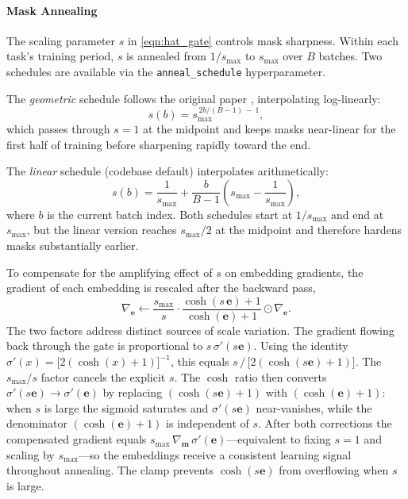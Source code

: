 \paragraph{Mask Annealing}

The scaling parameter $s$ in \eqref{eqn:hat_gate} controls mask sharpness.
Within each task's training period, $s$ is annealed from $1/s_\text{max}$ to
$s_\text{max}$ over $B$ batches. Two schedules are available via the
\texttt{anneal\_schedule} hyperparameter.

The \emph{geometric} schedule follows the original paper \cite{ll_hat_2018},
interpolating log-linearly:
%
\begin{equation}\label{eqn:hat_anneal_geometric}
    s(b)
    =
    s_\text{max}^{\,2b/(B-1)\,-\,1} ,
\end{equation}
%
which passes through $s = 1$ at the midpoint and keeps masks near-linear for
the first half of training before sharpening rapidly toward the end.

The \emph{linear} schedule (codebase default) interpolates arithmetically:
%
\begin{equation}\label{eqn:hat_anneal_linear}
    s(b)
    =
    \frac{1}{s_\text{max}}
    +
    \frac{b}{B-1}
    \left(s_\text{max} - \frac{1}{s_\text{max}}\right) ,
\end{equation}
%
where $b$ is the current batch index. Both schedules start at $1/s_\text{max}$
and end at $s_\text{max}$, but the linear version reaches $s_\text{max}/2$ at
the midpoint and therefore hardens masks substantially earlier.

To compensate for the amplifying effect of $s$ on embedding gradients, the
gradient of each embedding is rescaled after the backward pass,
%
\begin{equation}\label{eqn:hat_grad_comp}
    \nabla_{\mathbf{e}}
    \leftarrow
    \frac{s_\text{max}}{s}
    \cdot
    \frac{\cosh(s\,\mathbf{e}) + 1}
         {\cosh(\mathbf{e}) + 1}
    \odot
    \nabla_{\mathbf{e}} .
\end{equation}
%
The two factors address distinct sources of scale variation. The gradient
flowing back through the gate is proportional to $s\,\sigma'(s\mathbf{e})$.
Using the identity $\sigma'(x) = \bigl[2(\cosh(x)+1)\bigr]^{-1}$, this equals
$s\,/\,\bigl[2(\cosh(s\mathbf{e})+1)\bigr]$. The $s_\text{max}/s$ factor
cancels the explicit $s$. The $\cosh$ ratio then converts
$\sigma'(s\mathbf{e}) \to \sigma'(\mathbf{e})$ by replacing
$(\cosh(s\mathbf{e})+1)$ with $(\cosh(\mathbf{e})+1)$: when $s$ is large the
sigmoid saturates and $\sigma'(s\mathbf{e})$ near-vanishes, while the
denominator $(\cosh(\mathbf{e})+1)$ is independent of $s$. After both
corrections the compensated gradient equals
$s_\text{max}\,\nabla_{\mathbf{m}}\,\sigma'(\mathbf{e})$---equivalent to
fixing $s = 1$ and scaling by $s_\text{max}$---so the embeddings receive a
consistent learning signal throughout annealing. The clamp prevents
$\cosh(s\mathbf{e})$ from overflowing when $s$ is large.

